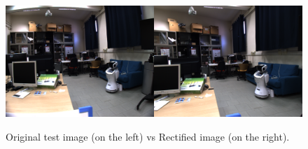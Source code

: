\documentclass{article}
\begin{document}
\begin{figure}[h] 
\begin{center} 
  \includegraphics[scale=0.35]{comparison1}\\ 
  \caption{\footnotesize{Original test image (on the left) vs Rectified image (on the right).}}
  \label{originalVSrect} 
\end{center} 
\end{figure}
\end{document}
